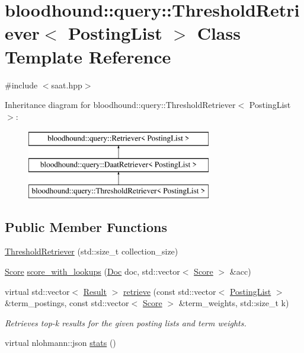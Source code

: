 \hypertarget{classbloodhound_1_1query_1_1ThresholdRetriever}{}\section{bloodhound\+:\+:query\+:\+:Threshold\+Retriever$<$ Posting\+List $>$ Class Template Reference}
\label{classbloodhound_1_1query_1_1ThresholdRetriever}


{\ttfamily \#include $<$saat.\+hpp$>$}

Inheritance diagram for bloodhound\+:\+:query\+:\+:Threshold\+Retriever$<$ Posting\+List $>$\+:\begin{figure}[H]
\begin{center}
\leavevmode
\includegraphics[height=3.000000cm]{classbloodhound_1_1query_1_1ThresholdRetriever}
\end{center}
\end{figure}
\subsection*{Public Member Functions}
\begin{DoxyCompactItemize}
\item 
\hyperlink{classbloodhound_1_1query_1_1ThresholdRetriever_a425d17d048e1fd3fd8157450c99df5bc}{Threshold\+Retriever} (std\+::size\+\_\+t collection\+\_\+size)
\item 
\hyperlink{structbloodhound_1_1Score}{Score} \hyperlink{classbloodhound_1_1query_1_1ThresholdRetriever_ac0a8731d270c477e04f24b89850a7d4a}{score\+\_\+with\+\_\+lookups} (\hyperlink{structbloodhound_1_1Doc}{Doc} doc, std\+::vector$<$ \hyperlink{structbloodhound_1_1Score}{Score} $>$ \&acc)
\item 
virtual std\+::vector$<$ \hyperlink{structbloodhound_1_1query_1_1Result}{Result} $>$ \hyperlink{classbloodhound_1_1query_1_1ThresholdRetriever_a06750450e1246e755ebad2d5dac6e8a8}{retrieve} (const std\+::vector$<$ \hyperlink{classbloodhound_1_1PostingList}{Posting\+List} $>$ \&term\+\_\+postings, const std\+::vector$<$ \hyperlink{structbloodhound_1_1Score}{Score} $>$ \&term\+\_\+weights, std\+::size\+\_\+t k)
\begin{DoxyCompactList}\small\item\em Retrieves top-\/k results for the given posting lists and term weights. \end{DoxyCompactList}\item 
virtual nlohmann\+::json \hyperlink{classbloodhound_1_1query_1_1ThresholdRetriever_aa21e5b44d70bfdf058e5f9c5a1abc008}{stats} ()
\end{DoxyCompactItemize}


